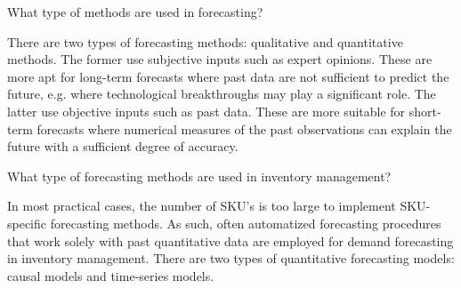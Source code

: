 \begin{question}
What type of methods are used in forecasting?

  \begin{solution}
    There are two types of forecasting methods: qualitative and quantitative methods. The former use subjective inputs such as expert opinions. These are more apt for long-term forecasts where past data are not sufficient to predict the future, e.g. where technological breakthroughs may play a significant role. The latter use objective inputs such as past data. These are more suitable for short-term forecasts where numerical measures of the past observations can explain the future with a sufficient degree of accuracy. 
   \end{solution}
\end{question}

\begin{question}
What type of forecasting methods are used in inventory management?

  \begin{solution}
	In most practical cases, the number of SKU's is too large to implement SKU-specific forecasting methods. As such, often automatized forecasting procedures that work solely with past quantitative data are employed for demand forecasting in inventory management. There are two types of quantitative forecasting models: causal models and time-series models.

   \end{solution}
\end{question}

